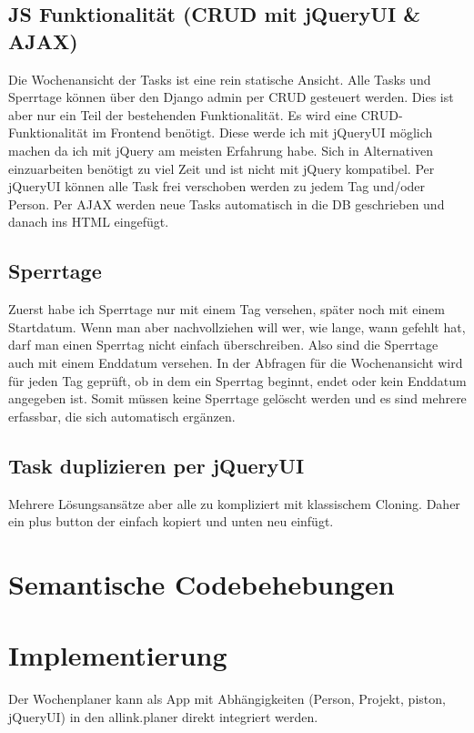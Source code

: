 \subsection{JS Funktionalität (CRUD mit jQueryUI \& AJAX) }
Die Wochenansicht der Tasks ist eine rein statische Ansicht.
Alle Tasks und Sperrtage können über den Django admin per CRUD gesteuert werden. Dies ist aber nur ein Teil der bestehenden Funktionalität.
Es wird eine CRUD-Funktionalität im Frontend benötigt. Diese werde ich mit jQueryUI möglich machen da ich mit jQuery am meisten Erfahrung habe.
Sich in Alternativen einzuarbeiten benötigt zu viel Zeit und ist nicht mit jQuery kompatibel.
Per jQueryUI können alle Task frei verschoben werden zu jedem Tag und/oder Person.
Per AJAX werden neue Tasks automatisch in die DB geschrieben und danach ins HTML eingefügt.
\subsection{Sperrtage}
Zuerst habe ich Sperrtage nur mit einem Tag versehen, später noch mit einem Startdatum.
Wenn man aber nachvollziehen will wer, wie lange, wann gefehlt hat, darf man einen Sperrtag nicht einfach überschreiben.
Also sind die Sperrtage auch mit einem Enddatum versehen. In der Abfragen für die Wochenansicht wird für jeden Tag geprüft,
ob in dem ein Sperrtag beginnt, endet oder kein Enddatum angegeben ist.
Somit müssen keine Sperrtage gelöscht werden und es sind mehrere erfassbar, die sich automatisch ergänzen.
\subsection{Task duplizieren per jQueryUI}
Mehrere Lösungsansätze aber alle zu kompliziert mit klassischem Cloning. Daher ein plus button der einfach kopiert und unten neu einfügt.
\section{Semantische Codebehebungen}
\section{Implementierung}
Der Wochenplaner kann als App mit Abhängigkeiten (Person, Projekt, piston, jQueryUI) in den allink.planer direkt integriert werden.
